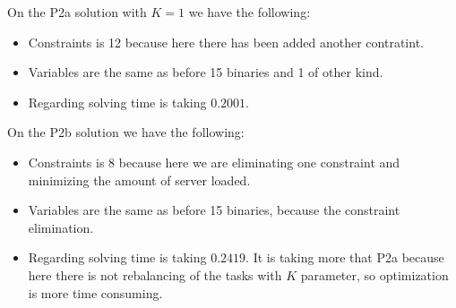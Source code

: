 \documentclass[12pt, a4paper]{article}
\begin{document}
On the P2a solution with $K=1$ we have the following:

\begin{itemize}
\item Constraints is 12 because here there has been added another contratint.
\item Variables are the same as before 15 binaries and 1 of other kind.
\item Regarding solving time is taking $0.2001$.
\end{itemize}

On the P2b solution we have the following:

\begin{itemize}
\item Constraints is 8 because here we are eliminating one constraint and
  minimizing the amount of server loaded.
\item Variables are the same as before 15 binaries, because the constraint elimination.
\item Regarding solving time is taking $0.2419$. It is taking more that P2a
  because here there is not rebalancing of the tasks with $K$ parameter, so
  optimization is more time consuming.
\end{itemize}
\end{document}
